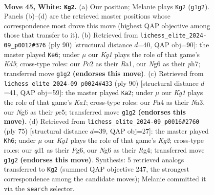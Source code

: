 \documentclass[11pt]{article}
\begin{document}
\clearpage

\begin{figure}[p]\centering
\begin{subfigure}{0.46\textwidth}\centering
\resizebox{\linewidth}{!}{%
\newchessgame
\chessboard[
  setfen={2r3k1/6p1/1p4N1/r2p4/P3p3/R7/2P2P2/3q2K1 w - - 0 45},
  showmover=false,
  pgfstyle=straightmove, color=movearrow, markmove={g1-g2}
]}
\caption{}
\end{subfigure}\hfill
\begin{subfigure}{0.46\textwidth}\centering
\resizebox{\linewidth}{!}{%
\newchessgame
\chessboard[
  setfen={3r3k/7p/1p6/p2KPr1p/3R1P2/8/8/R7 w - - 1 46},
  showmover=false,
  pgfstyle=straightmove, color=movearrow, markmove={d5-e6}
]}
\caption{}
\end{subfigure}
\\[4pt]
\begin{subfigure}{0.46\textwidth}\centering
\resizebox{\linewidth}{!}{%
\newchessgame
\chessboard[
  setfen={r6k/6p1/4p2p/4p3/2P1P3/NR5P/8/K1q5 w - - 1 46},
  showmover=false,
  pgfstyle=straightmove, color=movearrow, markmove={a1-a2}
]}
\caption{}
\end{subfigure}\hfill
\begin{subfigure}{0.46\textwidth}\centering
\resizebox{\linewidth}{!}{%
\newchessgame
\chessboard[
  setfen={8/6k1/r3pRp1/2ppP3/6r1/1P6/5P2/2R2K2 b - - 7 38},
  showmover=false,
  pgfstyle=straightmove, color=movearrow, markmove={g7-h6}
]}
\caption{}
\end{subfigure}
\caption{\textbf{Move 45, White: \texttt{Kg2}.} (a) Our position; Melanie plays \texttt{Kg2} (\texttt{g1g2}). Panels (b)--(d) are the retrieved master positions whose correspondence most drove this move (highest QAP objective among those that transfer to it). (b) Retrieved from \texttt{lichess\_elite\_2024-09\_p0012\#376} (ply 90) [structural distance $d$=40, QAP obj=90]: the master played \texttt{Ke6}; under $\mu$ our \emph{Kg1} plays the role of that game's \emph{Kd5}; cross-type roles: our \emph{P}c2 as their \emph{R}a1, our \emph{N}g6 as their \emph{p}h7; transferred move \texttt{g1g2} \textbf{(endorses this move)}. (c) Retrieved from \texttt{lichess\_elite\_2024-09\_p0024\#433} (ply 90) [structural distance $d$=41, QAP obj=59]: the master played \texttt{Ka2}; under $\mu$ our \emph{Kg1} plays the role of that game's \emph{Ka1}; cross-type roles: our \emph{P}a4 as their \emph{N}a3, our \emph{N}g6 as their \emph{p}e5; transferred move \texttt{g1g2} \textbf{(endorses this move)}. (d) Retrieved from \texttt{lichess\_elite\_2024-09\_p0016\#2760} (ply 75) [structural distance $d$=39, QAP obj=27]: the master played \texttt{Kh6}; under $\mu$ our \emph{Kg1} plays the role of that game's \emph{Kg2}; cross-type roles: our \emph{q}d1 as their \emph{P}g6, our \emph{N}g6 as their \emph{R}g4; transferred move \texttt{g1g2} \textbf{(endorses this move)}. Synthesis: 5 retrieved analogs transferred to \texttt{Kg2} (summed QAP objective 247, the strongest correspondence among the candidate moves); Melanie committed it via the \texttt{search} selector.}
\label{fig:thought-m88}
\end{figure}
\end{document}
